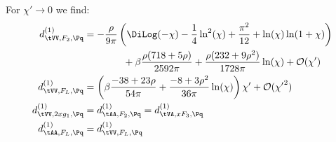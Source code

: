 For $\chi'\to 0$ we find:
\begin{align}
d_{\tVV,F_2,\Pq}^{(1)} &= -\frac{\rho}{9\pi}\left(\DiLog(-\chi) - \frac 1 4 \ln^2(\chi) + \frac{\pi^2}{12} + \ln(\chi)\ln(1+\chi)\right) \nonumber\\
 &\hspace{40pt} + \beta\frac{\rho(718+5\rho)}{2592\pi} + \frac{\rho(232+9\rho^2)}{1728\pi}\ln(\chi) + \mathcal O(\chi')\\
d_{\tVV,F_L,\Pq}^{(1)} &= \left(\beta\frac{-38+23\rho}{54\pi} + \frac{-8+3\rho^2}{36\pi}\ln(\chi)\right)\chi' + \mathcal O({\chi'}^2) \\
d_{\tVV,2xg_1,\Pq}^{(1)} &= d_{\tAA,F_2,\Pq}^{(1)} = d_{\tVA,xF_3,\Pq}^{(1)}\\
d_{\tAA,F_L,\Pq}^{(1)} &= d_{\tVV,F_L,\Pq}^{(1)}
\end{align}
